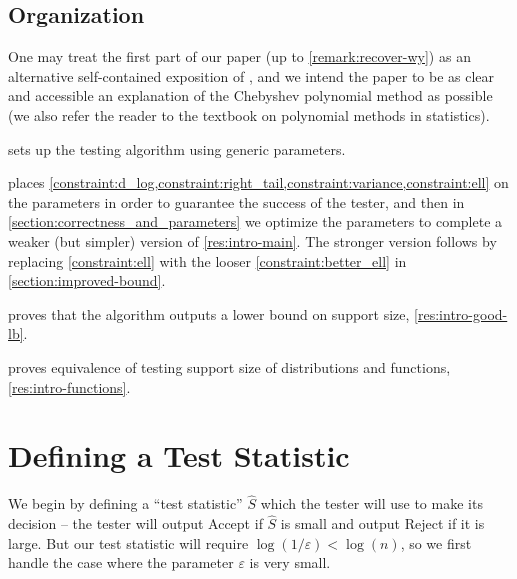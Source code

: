 \documentclass{theoretics}
\renewcommand{\epsilon}{\varepsilon}
\begin{document}
\subsection{Organization}

One may treat the first part of our paper (up to \cref{remark:recover-wy}) as an
alternative self-contained exposition of \cite{WY19}, and we intend the paper to be as clear and
accessible an explanation of the Chebyshev polynomial method as possible (we also refer the reader
to the textbook \cite{WY20} on polynomial methods in statistics).

\begin{description}[topsep=0pt,itemsep=0em]
\item[\cref{section:test-statistic}] sets up the testing algorithm using generic parameters.
\item[\cref{section:parameters}] places
\cref{constraint:d_log,constraint:right_tail,constraint:variance,constraint:ell} on the parameters
in order to guarantee the success of the tester, and then in
\cref{section:correctness_and_parameters} we optimize the parameters to complete a weaker (but
simpler) version of \cref{res:intro-main}. The stronger version follows by replacing
\cref{constraint:ell} with the looser \cref{constraint:better_ell} in \cref{section:improved-bound}.
\item[\cref{section:good-lower-bound}] proves that the algorithm outputs a lower bound on
support size, \cref{res:intro-good-lb}.
\item[\cref{section:functions}] proves equivalence of testing support size of
distributions and functions, \cref{res:intro-functions}.
\end{description}

\section{Defining a Test Statistic}
\label{section:test-statistic}

We begin by defining a ``test statistic'' $\widehat S$ which the tester will use to make its
decision -- the tester will output \textsf{Accept} if $\widehat S$ is small and output
\textsf{Reject} if it is large. But our test statistic will require $\log(1/\epsilon) < \log(n)$, so
we first handle the case where the parameter $\epsilon$ is very small.
\end{document}
